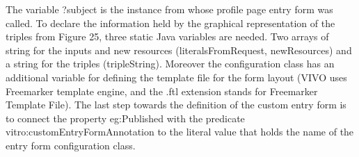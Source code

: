 
The variable ?subject is the instance from whose profile page entry form was called.  To declare the information held by the graphical representation of the triples from Figure 25, three static Java variables are needed. Two arrays of string for the inputs and new resources (literalsFromRequest, newResources) and a string for the triples (tripleString).  Moreover the configuration class has an additional variable for defining the template file for the form layout (VIVO uses Freemarker template engine, and the .ftl extension stands for Freemarker Template File). 
The last step towards the definition of the custom entry form is to connect the property eg:Published with the predicate vitro:customEntryFormAnnotation to the literal value that holds the name of the entry form configuration class.



